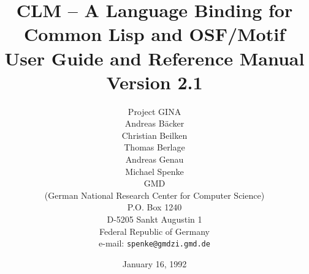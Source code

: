 
\renewcommand{\topfraction}{1}
\renewcommand{\bottomfraction}{1}
\renewcommand{\textfraction}{0}
\renewcommand{\floatpagefraction}{0.8}

\sloppy

\title{CLM -- A Language Binding for Common Lisp and OSF/Motif\\[0.5cm]
       User Guide and Reference Manual\\[0.5cm]
       Version 2.1}
\author{Project GINA \\[1cm] Andreas B\"acker \\ Christian Beilken \\ Thomas Berlage \\ Andreas Genau \\ Michael Spenke \\[0.4cm] GMD \\ (German National Research Center for Computer Science)\\
P.O. Box 1240\\
D-5205 Sankt Augustin 1\\
Federal Republic of Germany\\ 
e-mail: {\tt spenke@gmdzi.gmd.de}}
\date{January 16, 1992}

\makeindex

\newcommand{\lisp}[1]{\index{#1@{\tt #1}}{\tt #1}}
\newcommand{\lispfont}[1]{{\tt #1}}
\newcommand{\motif}[1]{\index{#1@{\tt #1}}{\tt #1}}
\newcommand{\motiffont}[1]{{\tt #1}}
\newcommand{\kw}[1]{\index{#1@{\tt :#1}}{\tt :#1}}
\newcommand{\motifclass}[2]{\kw{#1} (\motif{#2})}
\newcommand{\param}[1]{{\it #1}}
\newcommand{\fnsize}{\footnotesize}

\newcommand{\lispdef}[2]{\par\noindent\rule{\textwidth}{1mm}\par\noindent%
\addcontentsline{fcn}{function}{\protect\numberline{}{#1 (#2)}}%
\index{#1!#1@#2 description}{\large\tt#1}\hfill(#2)\label{f:#1}%
\par\noindent\rule{\textwidth}{0.5mm}}

\newcommand{\lispdefun}[1]{\lispdef{#1}{Function}}
\newcommand{\lispdefmacro}[1]{\lispdef{#1}{Macro}}
\newcommand{\lispdefvar}[1]{\lispdef{#1}{Variable}}

